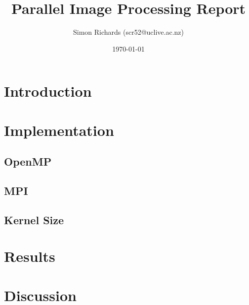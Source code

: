\documentclass{article}
\title{Parallel Image Processing Report}
\date{\today}
\author{Simon Richards (scr52@uclive.ac.nz)}
\begin{document}
\maketitle
\section{Introduction}


\section{Implementation}
\subsection{OpenMP}

\subsection{MPI}

\subsection{Kernel Size}

\section{Results}

\section{Discussion}
\end{document}
